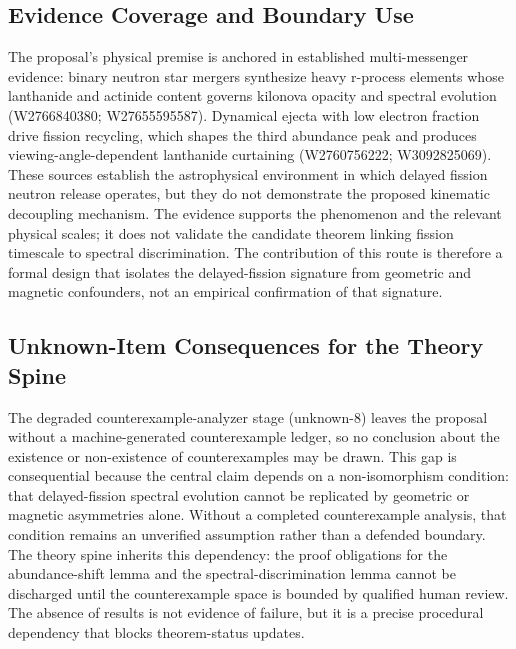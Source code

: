 \documentclass[conference]{IEEEtran}
\begin{document}
\subsection{Evidence Coverage and Boundary Use}
The proposal's physical premise is anchored in established multi-messenger evidence: binary neutron star mergers synthesize heavy r-process elements whose lanthanide and actinide content governs kilonova opacity and spectral evolution (W2766840380; W27655595587). Dynamical ejecta with low electron fraction drive fission recycling, which shapes the third abundance peak and produces viewing-angle-dependent lanthanide curtaining (W2760756222; W3092825069). These sources establish the astrophysical environment in which delayed fission neutron release operates, but they do not demonstrate the proposed kinematic decoupling mechanism. The evidence supports the phenomenon and the relevant physical scales; it does not validate the candidate theorem linking fission timescale to spectral discrimination. The contribution of this route is therefore a formal design that isolates the delayed-fission signature from geometric and magnetic confounders, not an empirical confirmation of that signature.~\cite{cite_07d6df5d6978a1fc,cite_612290131318c0d4,cite_0247e311d8727a8e}

\subsection{Unknown-Item Consequences for the Theory Spine}
The degraded counterexample-analyzer stage (unknown-8) leaves the proposal without a machine-generated counterexample ledger, so no conclusion about the existence or non-existence of counterexamples may be drawn. This gap is consequential because the central claim depends on a non-isomorphism condition: that delayed-fission spectral evolution cannot be replicated by geometric or magnetic asymmetries alone. Without a completed counterexample analysis, that condition remains an unverified assumption rather than a defended boundary. The theory spine inherits this dependency: the proof obligations for the abundance-shift lemma and the spectral-discrimination lemma cannot be discharged until the counterexample space is bounded by qualified human review. The absence of results is not evidence of failure, but it is a precise procedural dependency that blocks theorem-status updates.
\end{document}
